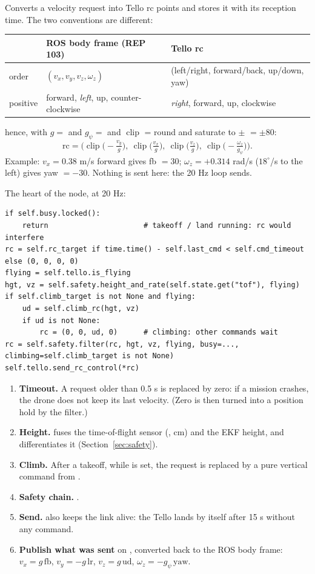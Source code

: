 Converts a velocity request into Tello rc points and stores it with its reception time. The two conventions are
different:
\begin{center}\small
\begin{tabular}{lll}
\toprule
& \textbf{ROS body frame (REP 103)} & \textbf{Tello rc} \\
\midrule
order & $(v_x, v_y, v_z, \omega_z)$ & (left/right, forward/back, up/down, yaw) \\
positive & forward, \emph{left}, up, counter-clockwise & \emph{right}, forward, up, clockwise \\
\bottomrule
\end{tabular}
\end{center}
hence, with $g=$  and $g_\psi=$  and $\operatorname{clip}$ = round and saturate to
$\pm$ $=\pm80$:
$$
\text{rc} = \Big(\operatorname{clip}\big(-\tfrac{v_y}{g}\big),\ \operatorname{clip}\big(\tfrac{v_x}{g}\big),\
\operatorname{clip}\big(\tfrac{v_z}{g}\big),\ \operatorname{clip}\big(-\tfrac{\omega_z}{g_\psi}\big)\Big).
$$
Example: $v_x=0.38$ m/s forward gives fb $=30$; $\omega_z=+0.314$ rad/s ($18^\circ$/s to the left) gives yaw $=-30$.
Nothing is sent here: the 20 Hz loop sends.

The heart of the node, at 20 Hz:
\begin{lstlisting}
if self.busy.locked():
    return                      # takeoff / land running: rc would interfere
rc = self.rc_target if time.time() - self.last_cmd < self.cmd_timeout else (0, 0, 0, 0)
flying = self.tello.is_flying
hgt, vz = self.safety.height_and_rate(self.state.get("tof"), flying)
if self.climb_target is not None and flying:
    ud = self.climb_rc(hgt, vz)
    if ud is not None:
        rc = (0, 0, ud, 0)      # climbing: other commands wait
rc = self.safety.filter(rc, hgt, vz, flying, busy=..., climbing=self.climb_target is not None)
self.tello.send_rc_control(*rc)
\end{lstlisting}
\begin{enumerate}[itemsep=1pt]
\item \textbf{Timeout.} A request older than 0.5 s is replaced by zero: if a mission crashes, the drone does not
keep its last velocity. (Zero is then turned into a position hold by the filter.)
\item \textbf{Height.} \code{height\_and\_rate} fuses the time-of-flight sensor (, cm) and the EKF
height, and differentiates it (Section~\ref{sec:safety}).
\item \textbf{Climb.} After a takeoff, while  is set, the request is replaced by a pure
vertical command from \code{climb\_rc}.
\item \textbf{Safety chain.} .
\item \textbf{Send.}  also keeps the link alive: the Tello lands by itself after 15 s
without any command.
\item \textbf{Publish what was sent} on , converted back to the ROS body frame:
$v_x=g\,\text{fb}$, $v_y=-g\,\text{lr}$, $v_z=g\,\text{ud}$, $\omega_z=-g_\psi\,\text{yaw}$.
\end{enumerate}

